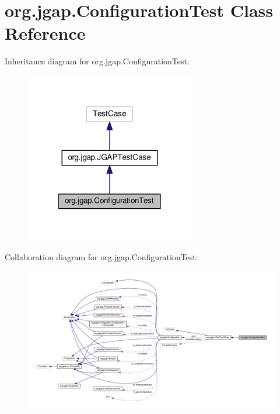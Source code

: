 \hypertarget{classorg_1_1jgap_1_1_configuration_test}{\section{org.\-jgap.\-Configuration\-Test Class Reference}
\label{classorg_1_1jgap_1_1_configuration_test}
}


Inheritance diagram for org.\-jgap.\-Configuration\-Test\-:
\nopagebreak
\begin{figure}[H]
\begin{center}
\leavevmode
\includegraphics[width=210pt]{classorg_1_1jgap_1_1_configuration_test__inherit__graph}
\end{center}
\end{figure}


Collaboration diagram for org.\-jgap.\-Configuration\-Test\-:
\nopagebreak
\begin{figure}[H]
\begin{center}
\leavevmode
\includegraphics[width=350pt]{classorg_1_1jgap_1_1_configuration_test__coll__graph}
\end{center}
\end{figure}
